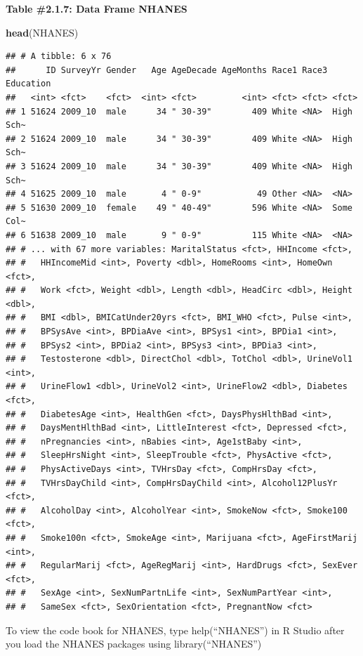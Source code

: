 \documentclass[]{book}
\newenvironment{Shaded}{\begin{snugshade}}{\end{snugshade}}
\newcommand{\KeywordTok}[1]{\textcolor[rgb]{0.13,0.29,0.53}{\textbf{#1}}}
\newcommand{\NormalTok}[1]{#1}
\begin{document}
\textbf{Table \#2.1.7: Data Frame NHANES}

\begin{Shaded}
\begin{Highlighting}[]
\KeywordTok{head}\NormalTok{(NHANES)}
\end{Highlighting}
\end{Shaded}

\begin{verbatim}
## # A tibble: 6 x 76
##      ID SurveyYr Gender   Age AgeDecade AgeMonths Race1 Race3 Education
##   <int> <fct>    <fct>  <int> <fct>         <int> <fct> <fct> <fct>    
## 1 51624 2009_10  male      34 " 30-39"        409 White <NA>  High Sch~
## 2 51624 2009_10  male      34 " 30-39"        409 White <NA>  High Sch~
## 3 51624 2009_10  male      34 " 30-39"        409 White <NA>  High Sch~
## 4 51625 2009_10  male       4 " 0-9"           49 Other <NA>  <NA>     
## 5 51630 2009_10  female    49 " 40-49"        596 White <NA>  Some Col~
## 6 51638 2009_10  male       9 " 0-9"          115 White <NA>  <NA>     
## # ... with 67 more variables: MaritalStatus <fct>, HHIncome <fct>,
## #   HHIncomeMid <int>, Poverty <dbl>, HomeRooms <int>, HomeOwn <fct>,
## #   Work <fct>, Weight <dbl>, Length <dbl>, HeadCirc <dbl>, Height <dbl>,
## #   BMI <dbl>, BMICatUnder20yrs <fct>, BMI_WHO <fct>, Pulse <int>,
## #   BPSysAve <int>, BPDiaAve <int>, BPSys1 <int>, BPDia1 <int>,
## #   BPSys2 <int>, BPDia2 <int>, BPSys3 <int>, BPDia3 <int>,
## #   Testosterone <dbl>, DirectChol <dbl>, TotChol <dbl>, UrineVol1 <int>,
## #   UrineFlow1 <dbl>, UrineVol2 <int>, UrineFlow2 <dbl>, Diabetes <fct>,
## #   DiabetesAge <int>, HealthGen <fct>, DaysPhysHlthBad <int>,
## #   DaysMentHlthBad <int>, LittleInterest <fct>, Depressed <fct>,
## #   nPregnancies <int>, nBabies <int>, Age1stBaby <int>,
## #   SleepHrsNight <int>, SleepTrouble <fct>, PhysActive <fct>,
## #   PhysActiveDays <int>, TVHrsDay <fct>, CompHrsDay <fct>,
## #   TVHrsDayChild <int>, CompHrsDayChild <int>, Alcohol12PlusYr <fct>,
## #   AlcoholDay <int>, AlcoholYear <int>, SmokeNow <fct>, Smoke100 <fct>,
## #   Smoke100n <fct>, SmokeAge <int>, Marijuana <fct>, AgeFirstMarij <int>,
## #   RegularMarij <fct>, AgeRegMarij <int>, HardDrugs <fct>, SexEver <fct>,
## #   SexAge <int>, SexNumPartnLife <int>, SexNumPartYear <int>,
## #   SameSex <fct>, SexOrientation <fct>, PregnantNow <fct>
\end{verbatim}

To view the code book for NHANES, type help(``NHANES'') in R Studio after you load the NHANES packages using library(``NHANES'')
\end{document}

